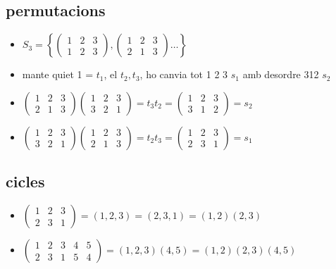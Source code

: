 \documentclass{article}
\begin{document}
\subsection{permutacions}
\begin{itemize}
\item $S_3 = \left\{\begin{pmatrix}1&2&3\\1&2&3\end{pmatrix}, \begin{pmatrix}1&2&3\\2&1&3\end{pmatrix} \dots \right\}$\\
\item mante quiet 1 = $t_1$, el $t_2, t_3$, ho canvia tot 1 2 3 $s_1$ amb desordre 312 $s_2$
\item $\begin{pmatrix}1&2&3\\2&1&3\end{pmatrix}\begin{pmatrix}1&2&3\\3&2&1\end{pmatrix} = t_3 t_2 = \begin{pmatrix}1&2&3\\3&1&2\end{pmatrix} = s_2$
\item $\begin{pmatrix}1&2&3\\3&2&1\end{pmatrix}\begin{pmatrix}1&2&3\\2&1&3\end{pmatrix} = t_2 t_3 = \begin{pmatrix}1&2&3\\2&3&1\end{pmatrix} = s_1$
\end{itemize}
\subsection{cicles}
\begin{itemize}
\item $\begin{pmatrix}1&2&3\\2&3&1\end{pmatrix} = (1, 2, 3) = (2, 3, 1) = (1, 2)(2, 3)$
\item $\begin{pmatrix}1&2&3&4&5\\2&3&1&5&4\end{pmatrix} = (1, 2, 3)(4, 5) = (1, 2)(2, 3)(4, 5)$
\end{itemize}
\end{document}
